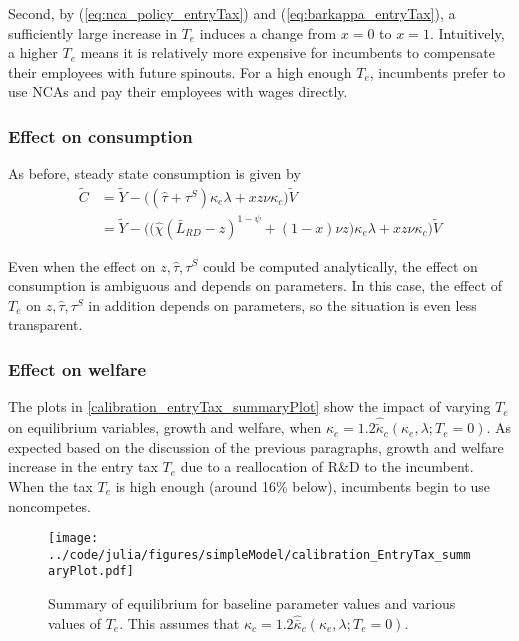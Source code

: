\documentclass[11pt,english]{article}
\begin{document}
Second, by (\ref{eq:nca_policy_entryTax}) and (\ref{eq:barkappa_entryTax}), a sufficiently large increase in $T_e$ induces a change from $x = 0$ to $x = 1$. Intuitively, a higher $T_e$ means it is relatively more expensive for incumbents to compensate their employees with future spinouts. For a high enough $T_e$, incumbents prefer to use NCAs and pay their employees with wages directly.

\subsubsection{Effect on consumption}

As before, steady state consumption is given by
\begin{align}
\tilde{C} &= \tilde{Y} - \Big( (\hat{\tau}  + \tau^S)\kappa_e \lambda + x z \nu \kappa_c \Big) \tilde{V} \\
&= \tilde{Y} - \Big( \big( \hat{\chi} (\bar{L}_{RD} - z)^{1-\psi} + (1-x) \nu z \big) \kappa_e \lambda + x z \nu \kappa_c \Big) \tilde{V}  \label{cs:scen3:consumption_eq}
\end{align}

Even when the effect on $z,\hat{\tau},\tau^S$ could be computed analytically, the effect on consumption is ambiguous and depends on parameters. In this case, the effect of $T_e$ on $z,\hat{\tau},\tau^S$ in addition depends on parameters, so the situation is even less transparent. 

\subsubsection{Effect on welfare}

The plots in \autoref{calibration_entryTax_summaryPlot} show the impact of varying $T_e$ on equilibrium variables, growth and welfare, when $\kappa_c = 1.2 \hat{\tilde{\kappa}}_c(\kappa_e,\lambda;T_e = 0)$. As expected based on the discussion of the previous paragraphs, growth and welfare increase in the entry tax $T_e$ due to a reallocation of R\&D to the incumbent. When the tax $T_e$ is high enough (around 16\% below), incumbents begin to use noncompetes.  

\begin{figure}[]
	\texttt{[image: ../code/julia/figures/simpleModel/calibration\_EntryTax\_summaryPlot.pdf]}
	\caption{Summary of equilibrium for baseline parameter values and various values of $T_e$. This assumes that $\kappa_c = 1.2 \hat{\bar{\kappa}}_c(\kappa_e,\lambda;T_e = 0)$.}
	\label{calibration_entryTax_summaryPlot}
\end{figure}
\end{document}
